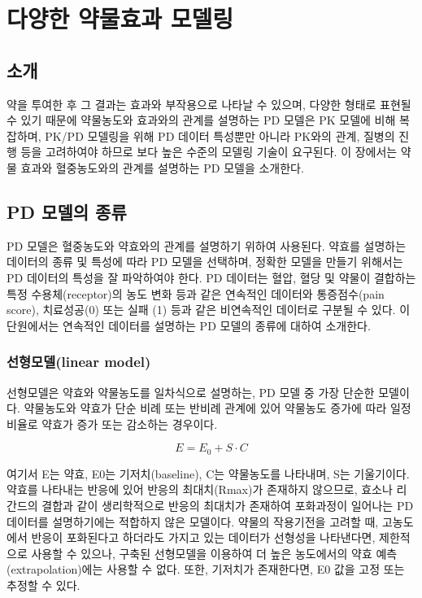 \documentclass[
  10pt,
]{krantz}
\begin{document}
\hypertarget{effect-model}{%
\chapter{다양한 약물효과 모델링}\label{effect-model}}

\hypertarget{uxc18cuxac1c-2}{%
\section{소개}\label{uxc18cuxac1c-2}}

약을 투여한 후 그 결과는 효과와 부작용으로 나타날 수 있으며, 다양한 형태로 표현될 수 있기 때문에 약물농도와 효과와의 관계를 설명하는 PD 모델은 PK 모델에 비해 복잡하며, PK/PD 모델링을 위해 PD 데이터 특성뿐만 아니라 PK와의 관계, 질병의 진행 등을 고려하여야 하므로 보다 높은 수준의 모델링 기술이 요구된다. 이 장에서는 약물 효과와 혈중농도와의 관계를 설명하는 PD 모델을 소개한다.

\hypertarget{pd-uxbaa8uxb378uxc758-uxc885uxb958}{%
\section{PD 모델의 종류}\label{pd-uxbaa8uxb378uxc758-uxc885uxb958}}

PD 모델은 혈중농도와 약효와의 관계를 설명하기 위하여 사용된다. 약효를 설명하는 데이터의 종류 및 특성에 따라 PD 모델을 선택하며, 정확한 모델을 만들기 위해서는 PD 데이터의 특성을 잘 파악하여야 한다. PD 데이터는 혈압, 혈당 및 약물이 결합하는 특정 수용체(receptor)의 농도 변화 등과 같은 연속적인 데이터와 통증점수(pain score), 치료성공(0) 또는 실패 (1) 등과 같은 비연속적인 데이터로 구분될 수 있다. 이 단원에서는 연속적인 데이터를 설명하는 PD 모델의 종류에 대하여 소개한다.

\hypertarget{uxc120uxd615uxbaa8uxb378linear-model}{%
\subsection{선형모델(linear model)}\label{uxc120uxd615uxbaa8uxb378linear-model}}

선형모델은 약효와 약물농도를 일차식으로 설명하는, PD 모델 중 가장 단순한 모델이다. 약물농도와 약효가 단순 비례 또는 반비례 관계에 있어 약물농도 증가에 따라 일정 비율로 약효가 증가 또는 감소하는 경우이다.

\[
E = E_0 + S \cdot C
\]

여기서 E는 약효, E0는 기저치(baseline), C는 약물농도를 나타내며, S는 기울기이다. 약효를 나타내는 반응에 있어 반응의 최대치(Rmax)가 존재하지 않으므로, 효소나 리간드의 결합과 같이 생리학적으로 반응의 최대치가 존재하여 포화과정이 일어나는 PD 데이터를 설명하기에는 적합하지 않은 모델이다. 약물의 작용기전을 고려할 때, 고농도에서 반응이 포화된다고 하더라도 가지고 있는 데이터가 선형성을 나타낸다면, 제한적으로 사용할 수 있으나, 구축된 선형모델을 이용하여 더 높은 농도에서의 약효 예측(extrapolation)에는 사용할 수 없다. 또한, 기저치가 존재한다면, E0 값을 고정 또는 추정할 수 있다.
\end{document}
